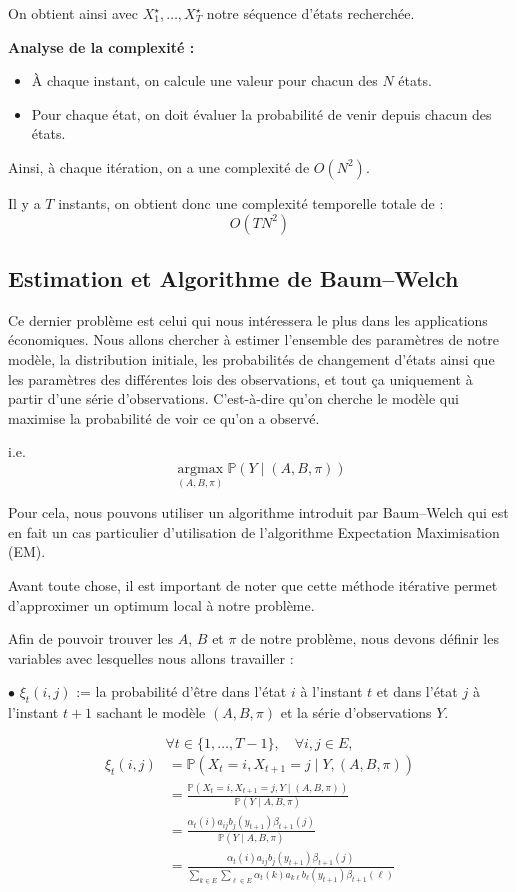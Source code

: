 \documentclass[11pt]{article}
\begin{document}
On obtient ainsi avec $X_1^\star,\dots,X_T^\star$ notre séquence d'états recherchée.

\vspace{0.3cm}

\textbf{Analyse de la complexité :}
\begin{itemize}
    \item À chaque instant, on calcule une valeur pour chacun des $N$ états.
    \item Pour chaque état, on doit évaluer la probabilité de venir depuis chacun des états.
\end{itemize}
Ainsi, à chaque itération, on a une complexité de $O(N^2)$.

Il y a $T$ instants, on obtient donc une complexité temporelle totale de :
\[
O(TN^2)
\]


\subsection{Estimation et Algorithme de Baum--Welch }

Ce dernier problème est celui qui nous intéressera le plus dans les applications économiques.
Nous allons chercher à estimer l'ensemble des paramètres de notre modèle, la distribution initiale, les probabilités de changement d'états ainsi que les paramètres des différentes lois des observations, et tout ça uniquement à partir d'une série d'observations.
C'est-à-dire qu'on cherche le modèle qui maximise la probabilité de voir ce qu'on a observé.

i.e.
\[
\operatorname*{argmax}_{(A,B,\pi)} \mathbb{P}(Y \mid (A,B,\pi))
\]

Pour cela, nous pouvons utiliser un algorithme introduit par Baum--Welch qui est en fait un cas particulier d'utilisation de l'algorithme Expectation Maximisation (EM).

Avant toute chose, il est important de noter que cette méthode itérative permet d'approximer un optimum local à notre problème.

Afin de pouvoir trouver les $A$, $B$ et $\pi$ de notre problème, nous devons définir les variables avec lesquelles nous allons travailler :

\textbf{$\bullet$} $\xi_t(i,j)$ := la probabilité d'être dans l'état $i$ à l'instant $t$ et dans l'état $j$ à l'instant $t+1$ sachant le modèle $(A,B,\pi)$ et la série d'observations $Y$.

\[
\forall t \in \{1,\dots,T-1\}, \quad \forall i,j \in E,
\]
\begin{align*}
\xi_t(i,j) 
&= \mathbb{P}(X_t=i,X_{t+1}=j \mid Y,(A,B,\pi)) \\
&= \frac{\mathbb{P}(X_t=i,X_{t+1}=j,Y \mid (A,B,\pi))}
{\mathbb{P}(Y \mid A,B,\pi)} \\
&= \frac{\alpha_t(i)a_{ij}b_j(y_{t+1})\beta_{t+1}(j)}
{\mathbb{P}(Y \mid A,B,\pi)} \\
&= \frac{\alpha_t(i)a_{ij}b_j(y_{t+1})\beta_{t+1}(j)}
{\sum_{k \in E}\sum_{\ell \in E}\alpha_t(k)a_{k\ell}b_\ell(y_{t+1})\beta_{t+1}(\ell)}
\end{align*}
\end{document}
